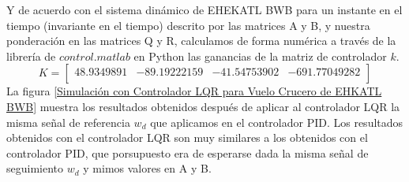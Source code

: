 Y de acuerdo con el sistema dinámico de EHEKATL BWB para un instante en el tiempo (invariante en el tiempo) descrito por las matrices A y B, y nuestra ponderación en las matrices Q y R, calculamos de forma numérica a través de la librería de $control.matlab$ en Python las ganancias de la matriz de controlador $k$.
\begin{equation}
    K
    =
    \begin{bmatrix}
    48.9349891 & -89.19222159 & -41.54753902 & -691.77049282 \\
    \end{bmatrix}
\end{equation}
La figura \ref{Simulación con Controlador LQR para Vuelo Crucero de EHKATL BWB} muestra los resultados obtenidos después de aplicar al controlador LQR la misma señal de referencia $w_d$ que aplicamos en el controlador PID. 
%
Los resultados obtenidos con el controlador LQR son muy similares a los obtenidos con el controlador PID, que porsupuesto era de esperarse dada la misma señal de seguimiento $w_d$ y mimos valores en A y B. 

\medskip

